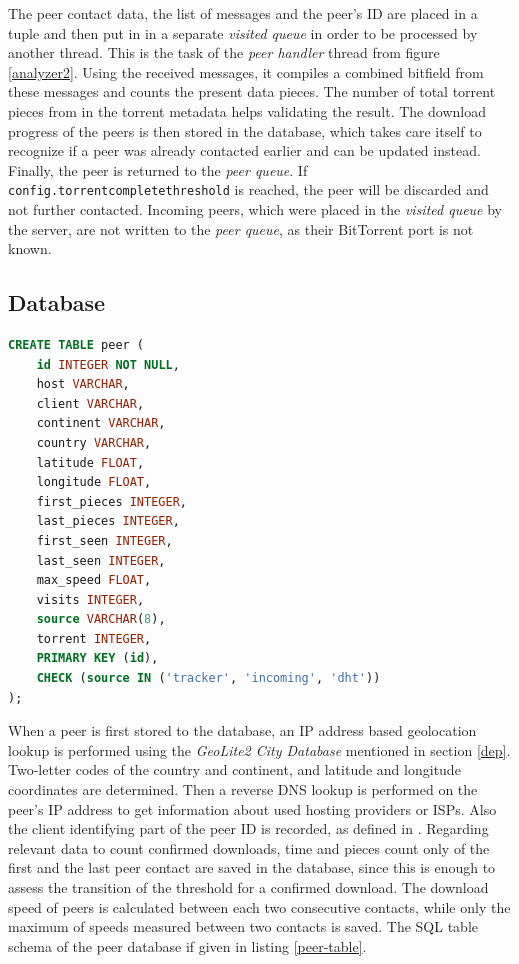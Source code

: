 \documentclass[10pt, a4paper, twoside=false, headsepline]{scrbook}
\renewcommand{\_}{\origunderscore\allowbreak}
\newcommand{\config}[1]{\texttt{config.\allowbreak #1}}
\begin{document}
The peer contact data, the list of messages and the peer's ID are placed in a tuple and then put in in a separate \emph{visited queue} in order to be processed by another thread. This is the task of the \emph{peer handler} thread from figure \ref{analyzer2}. Using the received messages, it compiles a combined bitfield from these messages and counts the present data pieces. The number of total torrent pieces from in the torrent metadata helps validating the result. The download progress of the peers is then stored in the database, which takes care itself to recognize if a peer was already contacted earlier and can be updated instead. Finally, the peer is returned to the \emph{peer queue}. If \config{torrent\_complete\_threshold} is reached, the peer will be discarded and not further contacted. Incoming peers, which were placed in the \emph{visited queue} by the server, are not written to the \emph{peer queue}, as their BitTorrent port is not known.

\subsection{Database}
\begin{lstlisting}[float, language=SQL, caption={[Schema of the peer table]Schema of the peer table in SQL.}, captionpos=b, label=peer-table]
CREATE TABLE peer (
	id INTEGER NOT NULL,
	host VARCHAR,
	client VARCHAR,
	continent VARCHAR,
	country VARCHAR,
	latitude FLOAT,
	longitude FLOAT,
	first_pieces INTEGER,
	last_pieces INTEGER,
	first_seen INTEGER,
	last_seen INTEGER,
	max_speed FLOAT,
	visits INTEGER,
	source VARCHAR(8),
	torrent INTEGER,
	PRIMARY KEY (id),
	CHECK (source IN ('tracker', 'incoming', 'dht'))
);
\end{lstlisting}

When a peer is first stored to the database, an IP address based geolocation lookup is performed using the \emph{GeoLite2 City Database} mentioned in section \ref{dep}. Two-letter codes of the country and continent, and latitude and longitude coordinates are determined. Then a reverse DNS lookup is performed on the peer's IP address to get information about used hosting providers or ISPs. Also the client identifying part of the peer ID is recorded, as defined in \cite{bep20}. Regarding relevant data to count confirmed downloads, time and pieces count only of the first and the last peer contact are saved in the database, since this is enough to assess the transition of the threshold for a confirmed download. The download speed of peers is calculated between each two consecutive contacts, while only the maximum of speeds measured between two contacts is saved. The SQL table schema of the peer database if given in listing \ref{peer-table}.
\end{document}
